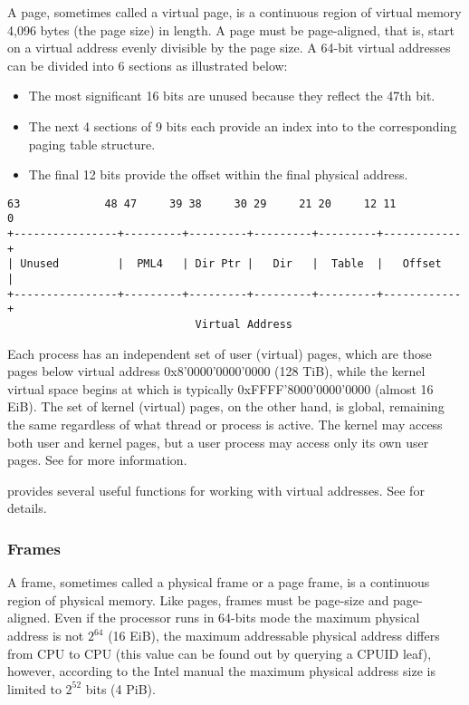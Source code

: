 A page, sometimes called a virtual page, is a continuous region of virtual memory 4,096 bytes (the 
page size) in length. A page must be page-aligned, that is, start on a virtual address evenly
divisible by the page size. A 64-bit virtual addresses can be divided into 6 sections as illustrated
below:
\begin{itemize}
	\item The most significant 16 bits are unused because they reflect the 47th bit.
	\item The next 4 sections of 9 bits each provide an index into to the corresponding paging table
structure.
	\item The final 12 bits provide the offset within the final physical address.
\end{itemize}

\begin{verbatim}
63             48 47     39 38     30 29     21 20     12 11          0
+----------------+---------+---------+---------+---------+------------+
| Unused         |  PML4   | Dir Ptr |   Dir   |  Table  |   Offset   |
+----------------+---------+---------+---------+---------+------------+
                             Virtual Address
\end{verbatim}

Each process has an independent set of user (virtual) pages, which are those pages below virtual 
address 0x8'0000'0000'0000 (128 TiB), while the kernel virtual space begins at 
 which is typically 0xFFFF'8000'0000'0000 (almost 16 EiB). The set of
kernel (virtual) pages, on the other hand, is global, remaining the same regardless of what thread  
or process is active. The kernel may access both user and kernel pages, but a user process may 
access only its own user pages. See  for more information.

\projectname provides several useful functions for working with virtual addresses. See 
 for details.

\subsubsection{Frames}

A frame, sometimes called a physical frame or a page frame, is a continuous region of physical
memory. Like pages, frames must be page-size and page-aligned. Even if the processor runs in 64-bits
mode the maximum physical address is not $2^{64}$ (16 EiB), the maximum addressable physical address
differs from CPU to CPU (this value can be found out by querying a CPUID leaf), however, according 
to the Intel manual the maximum physical address size is limited to $2^{52}$ bits (4 PiB).

